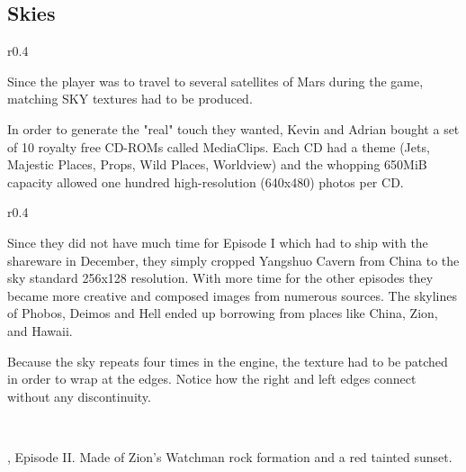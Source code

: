 \subsection{Skies}
\begin{wrapfigure}[7]{r}{0.4\textwidth}
\centering
{}
\end{wrapfigure}
Since the player was to travel to several satellites of Mars during the game, matching SKY textures had to be produced.\\
\par In order to generate the "real" touch they wanted, Kevin and Adrian bought a set of 10 royalty free CD-ROMs called MediaClips. Each CD had a theme (Jets, Majestic Places, Props, Wild Places, Worldview) and the whopping 650MiB capacity allowed one hundred high-resolution (640x480) photos per CD.\\
\par 

\begin{wrapfigure}[7]{r}{0.4\textwidth}
\centering
{}
\end{wrapfigure}

Since they did not have much time for Episode I which had to ship with the shareware in December, they simply cropped Yangshuo Cavern from China to the sky standard 256x128 resolution.  With more time for the other episodes they became more creative and composed images from numerous sources. The skylines of Phobos, Deimos and Hell ended up borrowing from places like China, Zion, and Hawaii. \\
\par

Because the sky repeats four times in the engine, the texture had to be patched in order to wrap at the edges. Notice how the right and left edges connect without any discontinuity.\\
\par
{}\\
\par
{}





\begin{minipage}{\textwidth}
\par \vspace{5pt}
\doom{}, Episode II. Made of Zion's Watchman rock formation and a red tainted sunset.\\
\par
{}
\end{minipage}






